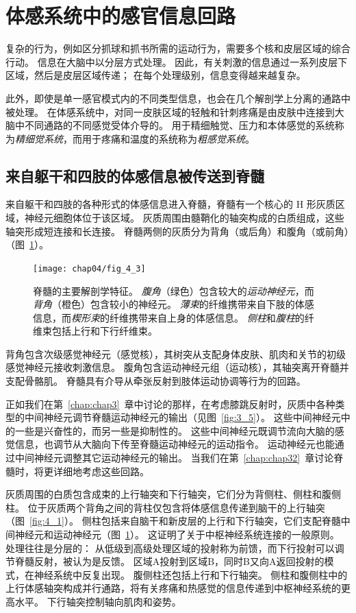\section{体感系统中的感官信息回路}

复杂的行为，例如区分抓球和抓书所需的运动行为，需要多个核和皮层区域的综合行动。
信息在大脑中以分层方式处理。
因此，有关刺激的信息通过一系列皮层下区域，然后是皮层区域传递； 
在每个处理级别，信息变得越来越复杂。


此外，即使是单一感官模式内的不同类型信息，也会在几个解剖学上分离的通路中被处理。
在体感系统中，对同一皮肤区域的轻触和针刺疼痛是由皮肤中连接到大脑中不同通路的不同感觉受体介导的。 
用于精细触觉、压力和本体感觉的系统称为\textit{精细觉系统}，而用于疼痛和温度的系统称为\textit{粗感觉系统}。



\subsection{来自躯干和四肢的体感信息被传送到脊髓}

来自躯干和四肢的各种形式的体感信息进入脊髓，脊髓有一个核心的 H 形灰质区域，神经元细胞体位于该区域。 
灰质周围由髓鞘化的轴突构成的白质组成，这些轴突形成短连接和长连接。
脊髓两侧的灰质分为背角（或后角）和腹角（或前角）（图~\ref{fig:4_3}）。


\begin{figure}[htbp]
	\centering
	\texttt{[image: chap04/fig\_4\_3]}
	\caption{脊髓的主要解剖学特征。 
		\textit{腹角}（绿色）包含较大的\textit{运动神经元}，而\textit{背角}（橙色）包含较小的神经元。
		\textit{薄束}的纤维携带来自下肢的体感信息，而\textit{楔形束}的纤维携带来自上身的体感信息。
		\textit{侧柱}和\textit{腹柱}的纤维束包括上行和下行纤维束。}
	\label{fig:4_3}
\end{figure}


背角包含次级感觉神经元（感觉核），其树突从支配身体皮肤、肌肉和关节的初级感觉神经元接收刺激信息。
腹角包含运动神经元组（运动核），其轴突离开脊髓并支配骨骼肌。
脊髓具有介导从牵张反射到肢体运动协调等行为的回路。


正如我们在第~\ref{chap:chap3}~章中讨论的那样，在考虑膝跳反射时，灰质中各种类型的中间神经元调节脊髓运动神经元的输出（见图~\ref{fig:3_5}）。 
这些中间神经元中的一些是兴奋性的，而另一些是抑制性的。
这些中间神经元既调节流向大脑的感觉信息，也调节从大脑向下传至脊髓运动神经元的运动指令。
运动神经元也能通过中间神经元调整其它运动神经元的输出。
当我们在第~\ref{chap:chap32}~章讨论脊髓时，将更详细地考虑这些回路。


灰质周围的白质包含成束的上行轴突和下行轴突，它们分为背侧柱、侧柱和腹侧柱。
位于灰质两个背角之间的背柱仅包含将体感信息传递到脑干的上行轴突（图~\ref{fig:4_1}）。
侧柱包括来自脑干和新皮层的上行和下行轴突，它们支配脊髓中间神经元和运动神经元（图~\ref{fig:4_3}）。 
这证明了关于中枢神经系统连接的一般原则。
处理往往是分层的：
从低级到高级处理区域的投射称为前馈，而下行投射可以调节脊髓反射，被认为是反馈。 
区域A投射到区域B，同时B又向A返回投射的模式，在神经系统中反复出现。
腹侧柱还包括上行和下行轴突。 
侧柱和腹侧柱中的上行体感轴突构成并行通路，将有关疼痛和热感觉的信息传递到中枢神经系统的更高水平。 
下行轴突控制轴向肌肉和姿势。


